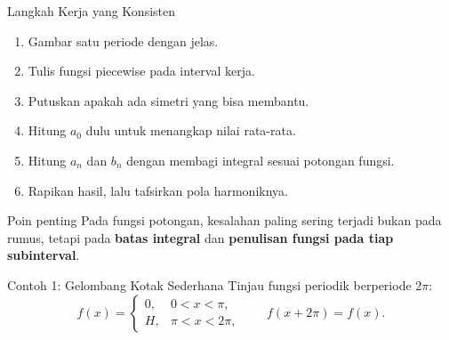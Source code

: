 \documentclass[aspectratio=169,10pt]{beamer}
\begin{document}
\begin{frame}{Langkah Kerja yang Konsisten}
\begin{enumerate}
  \item Gambar satu periode dengan jelas.
  \item Tulis fungsi piecewise pada interval kerja.
  \item Putuskan apakah ada simetri yang bisa membantu.
  \item Hitung $a_0$ dulu untuk menangkap nilai rata-rata.
  \item Hitung $a_n$ dan $b_n$ dengan membagi integral sesuai potongan fungsi.
  \item Rapikan hasil, lalu tafsirkan pola harmoniknya.
\end{enumerate}
\begin{exampleblock}{Poin penting}
Pada fungsi potongan, kesalahan paling sering terjadi bukan pada rumus, tetapi pada \textbf{batas integral} dan \textbf{penulisan fungsi pada tiap subinterval}.
\end{exampleblock}
\end{frame}

\begin{frame}{Contoh 1: Gelombang Kotak Sederhana}
Tinjau fungsi periodik berperiode $2\pi$:
\[
f(x)=
\begin{cases}
0, & 0<x<\pi,\\
H, & \pi<x<2\pi,
\end{cases}
\qquad f(x+2\pi)=f(x).
\]
\begin{center}
\end{center}
\end{frame}
\end{document}
